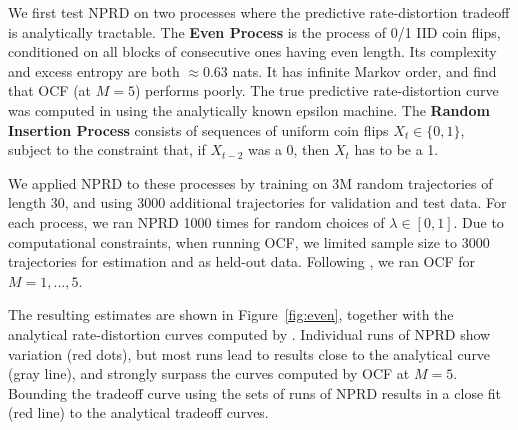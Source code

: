 \documentclass[entropy,article,submit,moreauthors,pdftex,10pt,a4paper]{Definitions/mdpi}
\newcommand{\key}{\textbf}
\begin{document}
We first test NPRD on two processes where the predictive rate-distortion tradeoff is analytically tractable. %
The \key{Even Process} \citep{marzen-predictive-2016} is the process of 0/1 IID coin flips, conditioned on all blocks of consecutive ones having even length.
Its complexity and excess entropy are both $\approx 0.63$ nats. %
It has infinite Markov order, and \citet{marzen-predictive-2016} find that OCF (at $M=5$) performs poorly. %
The true predictive rate-distortion curve was computed in \cite{marzen-predictive-2016} using the analytically known epsilon machine.
The \key{Random Insertion Process} \citep{marzen-predictive-2016} consists of sequences of uniform coin flips $X_t \in \{0,1\}$, subject to the constraint that, if $X_{t-2}$ was a 0, then $X_{t}$ has to be a 1.



We applied NPRD to these processes by training on 3M random trajectories of length 30, and using 3000 additional trajectories for validation and test data.
For each process, we ran NPRD 1000 times for random choices of $\lambda \in [0,1]$.
Due to computational constraints, when running OCF, we limited sample size to 3000 trajectories for estimation and as held-out data.
Following \citet{marzen-predictive-2016}, we ran OCF for $M=1,...,5$.

The resulting estimates are shown in Figure~\ref{fig:even}, together with the analytical rate-distortion curves computed by \citet{marzen-predictive-2016}.
Individual runs of NPRD show variation (red dots), but most runs lead to results close to the analytical curve (gray line), and strongly surpass the curves computed by OCF at $M=5$.
Bounding the tradeoff curve using the sets of runs of NPRD results in a close fit (red line) to the analytical tradeoff curves.
\end{document}

